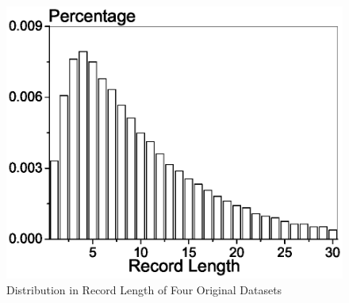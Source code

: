 \begin{figure}[th]
{\begin{minipage}[c]{0.46\textwidth}
  \includegraphics[width=1.0\columnwidth]{retail.eps}
\end{minipage}%
}
\caption{Distribution in Record Length of Four Original Datasets}\label{fig:datasets}
\end{figure}

